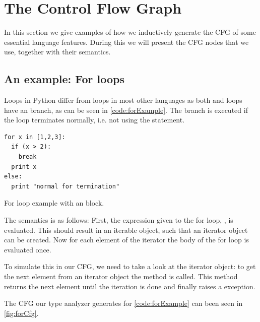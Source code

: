 \chapter{The Control Flow Graph}
\label{chap:CFGConstruction}
In this section we give examples of how we inductively generate the CFG of some essential language features. 
During this we will present the CFG nodes that we use, together with their semantics.


\section{An example: For loops}
\label{sec:CFGConstructionLoops}
Loops in Python differ from loops in most other languages as both  and  loops have an  branch, as can be seen in \autoref{code:forExample}. The  branch is executed if the loop terminates normally, i.e. not using the  statement.

\begin{listing}[H]
  \begin{verbatim}
for x in [1,2,3]:
  if (x > 2):
    break
  print x
else:
  print "normal for termination"
  \end{verbatim}
  \caption{For loop example with an  block.}\label{code:forExample}
\end{listing}

The semantics is as follows: First, the expression given to the for loop, \inlinecode{[1,2,3]}, is evaluated. This should result in an iterable object, such that an iterator object can be created. Now for each element of the iterator the body of the for loop is evaluated once.

To simulate this in our CFG, we need to take a look at the iterator object: to get the next element from an iterator object the  method is called. This method returns the next element until the iteration is done and finally raises a  exception.

The CFG our type analyzer generates for \autoref{code:forExample} can been seen in \autoref{fig:forCfg}.

